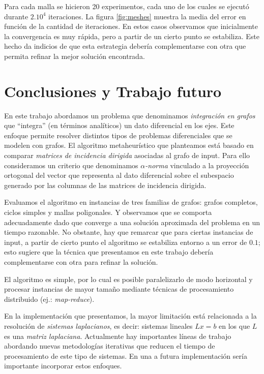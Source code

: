 \documentclass[conference,compsoc,a4paper]{IEEEtran}
\begin{document}
\smallskip

Para cada malla se hicieron 20 experimentos, cada uno de los cuales se 
ejecutó durante $2.10^4$ iteraciones. La figura \ref{fig:meshes} 
muestra la media del error en función de la cantidad de iteraciones. En 
estos casos observamos que inicialmente la convergencia es muy rápida, 
pero a partir de un cierto punto se estabiliza. Este hecho da 
indicios de que esta estrategia debería complementarse con otra que 
permita refinar la mejor solución encontrada.


\section{Conclusiones y Trabajo futuro}

En este trabajo abordamos un problema que denominamos \emph{integración 
en grafos} que ``integra'' (en términos analíticos) un dato 
diferencial en los ejes. Este enfoque permite resolver distintos tipos 
de problemas diferenciales que se modelen con grafos. El algoritmo 
metaheurístico que planteamos está basado en comparar \emph{matrices 
de incidencia dirigida} asociadas al grafo de input. Para ello 
consideramos un criterio que denominamos \emph{$\alpha$-norma} vinculado 
a la proyección ortogonal del vector que representa al dato diferencial 
sobre el subespacio generado por las columnas de las matrices de 
incidencia dirigida.

\bigskip

Evaluamos el algoritmo en instancias de tres familias de grafos: grafos 
completos, ciclos simples y mallas poligonales. Y observamos que se comporta 
adecuadamente dado que converge a una solución aproximada del problema 
en un tiempo razonable. No obstante, hay que remarcar que para ciertas 
instancias de input, a partir de cierto punto el algoritmo se 
estabiliza entorno a un error de $0.1$; esto sugiere que la técnica que 
presentamos en este trabajo debería complementarse con otra para 
refinar la solución.

\bigskip

El algoritmo es simple, por lo cual es posible paralelizarlo de modo 
horizontal y procesar instancias de mayor tamaño mediante técnicas 
de procesamiento distribuido (ej.: \emph{map-reduce}).

\bigskip

En la implementación que presentamos, la mayor limitación está 
relacionada a la resolución de \emph{sistemas laplacianos}, es decir: 
sistemas lineales $Lx=b$ en los que $L$ es una \emph{matriz 
laplaciana}. Actualmente hay importantes líneas de trabajo abordando 
nuevas metodologías iterativas que reducen el tiempo de 
procesamiento de este tipo de sistemas. En una a futura implementación
 sería importante incorporar estos enfoques. 
\end{document}
